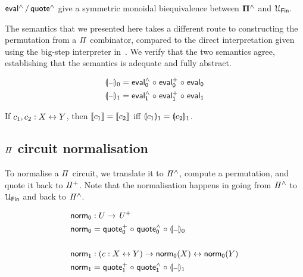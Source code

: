 \begin{proposition}
  $\evalh/\quoteh$ give a symmetric monoidal biequivalence between $\mathbf{\Pi^{\wedge}}$ and $\UFin$.
\end{proposition}

The semantics that we presented here takes a different route to constructing the permutation from a $\mathit{\Pi}$
combinator, compared to the direct interpretation given using the big-step interpreter in~. We
verify that the two semantics agree, establishing that the semantics is adequate and fully abstract.

\begin{definition}
  \begin{align*}
    \gdenot{\blank}_{0} & = \evalh_{0} \comp \evalp_{0} \comp \evalt_{0} \\
    \gdenot{\blank}_{1} & = \evalh_{1} \comp \evalp_{1} \comp \evalt_{1}
  \end{align*}
\end{definition}

\begin{proposition}
  If $c_1, c_2 : X \mathrel{\leftrightarrow} Y$, then $\llbracket c_1\rrbracket = \llbracket c_2\rrbracket$ iff $\llparenthesis c_1\rrparenthesis_{1} = \llparenthesis c_2\rrparenthesis_{1}$.
\end{proposition}

\subsection{$\mathit{\Pi}$ circuit normalisation}

To normalise a $\mathit{\Pi}$ circuit, we translate it to $\mathit{{\Pi}^{\wedge}}$, compute a permutation, and quote it back to
$\mathit{{\Pi}^{+}}$. Note that the normalisation happens in going from $\mathit{{\Pi}^{\wedge}}$ to $\UFin$ and back to $\mathit{{\Pi}^{\wedge}}$.

\begin{definition}
  \begin{align*}
    \normt_{0} & : U \to \UPlus                                            \\
    \normt_{0} & = \quotep_{0} \comp \quoteh_{0} \comp \gdenot{\blank}_{0} \\
    \\
    \normt_{1} & : (c : X \iso Y) \to \normt_{0}(X) \iso \normt_{0}(Y)     \\
    \normt_{1} & = \quotep_{1} \comp \quoteh_{1} \comp \gdenot{\blank}_{1}
  \end{align*}
\end{definition}

